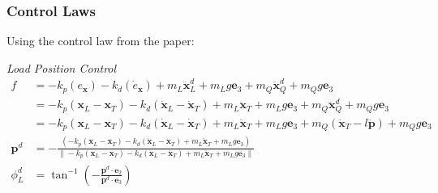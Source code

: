 \documentclass[11pt]{article}
\begin{document}
\newpage
\subsubsection{Control Laws} 

%

Using the control law from the paper: 

\emph{Load Position Control}
\begin{align*}
f &= -k_p (e_{\mathbf{x}}) - k_d ( \dot{e}_{\mathbf{x}} ) + m_L \mathbf{\ddot{x}}_L^d + m_L g \mathbf{e}_3 + m_Q \mathbf{\ddot{x}}_Q^d + m_Q g \mathbf{e}_3 \\
&=  -k_p (\mathbf{x}_L - \mathbf{x}_T) - k_d (\mathbf{\dot{x}}_L - \mathbf{\dot{x}}_T) + m_L \mathbf{\ddot{x}}_T + m_L g \mathbf{e}_3 + m_Q \mathbf{\ddot{x}}_Q^d + m_Q g \mathbf{e}_3 \\
&= -k_p (\mathbf{x}_L - \mathbf{x}_T) - k_d (\mathbf{\dot{x}}_L - \mathbf{\dot{x}}_T) + m_L \mathbf{\ddot{x}}_T + m_L g \mathbf{e}_3 + m_Q (\mathbf{\ddot{x}}_T - l \mathbf{\ddot{p}}) + m_Q g \mathbf{e}_3 \\
\mathbf{p}^d &= - \frac{ (-k_p (\mathbf{x}_L - \mathbf{x}_T) - k_d (\mathbf{\dot{x}}_L - \mathbf{\dot{x}}_T) + m_L \mathbf{\ddot{x}}_T + m_L g \mathbf{e}_3)  } { \| -k_p (\mathbf{x}_L - \mathbf{x}_T) - k_d (\mathbf{\dot{x}}_L - \mathbf{\dot{x}}_T) + m_L \mathbf{\ddot{x}}_T + m_L g \mathbf{e}_3 \| } \\
\phi_L^d &= \tan^{-1} \left( -\frac{ \mathbf{p}^d \cdot \mathbf{e}_2 } { \mathbf{p}^d \cdot \mathbf{e}_3 } \right) \\
\end{align*}
\end{document}
